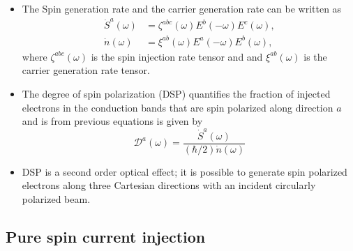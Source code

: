 \documentclass{beamer}
\begin{document}
\begin{frame}


{\small

\begin{itemize}

\item 
The Spin generation rate and the carrier generation rate can be written as
\vspace{-4mm}
\begin{align}
\dot{S}^{a}(\omega)&= 
\zeta^{abc}(\omega)E^{b}(-\omega)E^{c}(\omega), \\
\dot{n}(\omega)&= 
\xi^{ab}(\omega)E^{a}(-\omega)E^{b}(\omega),
\end{align}
where $\zeta^{abc}(\omega)$ is the spin injection rate tensor and and $\xi^
{ab}(\omega)$ is the carrier generation rate tensor.

\item 
The degree of spin polarization (DSP) quantifies the fraction of injected
electrons in the conduction bands that are spin polarized along direction $a$
and is from previous equations is given by
\vspace{-2mm}
\begin{equation}\label{eq:dsp}
\mathcal{D}^{a}(\omega)=
\frac{\dot{S}^{a}(\omega)}{(\hbar/2)\dot{n}(\omega)}
\end{equation}

\item 
DSP is a second order optical effect; it is possible to generate spin
polarized
electrons along three Cartesian directions with an incident circularly polarized
beam.


\end{itemize}
}


\end{frame}




\subsection{Pure spin current injection}
\end{document}
